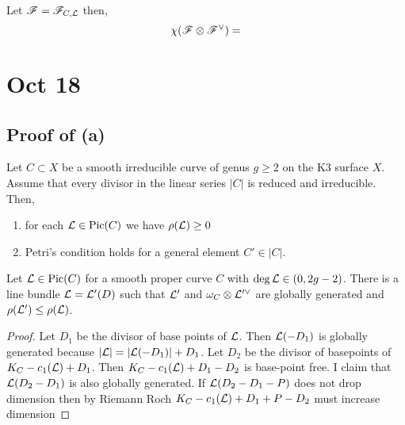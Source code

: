 \documentclass[12pt]{article}
\begin{document}
\begin{lemma}
Let $\mathscr{F} = \mathscr{F}_{C, \mathcal{L}}$ then,
\[ \chi(\mathscr{F} \otimes \mathscr{F}^\vee)  = \]
\end{lemma}

\section{Oct 18}

\subsection{Proof of (a)}

\begin{theorem}[Main]
Let $C \subset X$ be a smooth irreducible curve of genus $g \ge 2$ on the K3 surface $X$. Assume that every divisor in the linear series $|C|$ is reduced and irreducible. Then,
\begin{enumerate}
\item for each $\mathcal{L} \in \mathrm{Pic}{(C)}$ we have $\rho(\mathcal{L}) \ge 0$
\item Petri's condition holds for a general element $C' \in |C|$.
\end{enumerate}
\end{theorem}

\begin{lemma}
Let $\mathcal{L} \in \mathrm{Pic}{(C)}$ for a smooth proper curve $C$ with $\deg{\mathcal{L}} \in (0, 2g - 2)$. There is a line bundle $\mathcal{L} = \mathcal{L}'(D)$ such that $\mathcal{L}'$ and $\omega_C \otimes \mathcal{L}'^\vee$ are globally generated and $\rho(\mathcal{L}') \le \rho(\mathcal{L})$.
\end{lemma}

\begin{proof}
Let $D_1$ be the divisor of base points of $\mathcal{L}$. Then $\mathcal{L}(-D_1)$ is globally generated because $|\mathcal{L}| = |\mathcal{L}(-D_1)| + D_1$. Let $D_2$ be the divisor of basepoints of $K_C - c_1(\mathcal{L}) + D_1$. Then $K_C - c_1(\mathcal{L}) + D_1 - D_2$ is base-point free. I claim that $\mathcal{L}(D_2 - D_1)$ is also globally generated. If $\mathcal{L}(D_2 - D_1 - P)$ does not drop dimension then by Riemann Roch $K_C - c_1(\mathcal{L}) + D_1 + P - D_2$ must increase dimension 
\end{proof}
\end{document}
